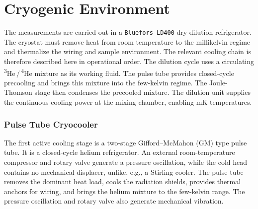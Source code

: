 \chapter{Cryogenic Environment}
\label{appendix:cryostat}

    The measurements are carried out in a \texttt{Bluefors LD400} dry dilution refrigerator. The cryostat must remove heat from room temperature to the millikelvin regime and thermalize the wiring and sample environment. The relevant cooling chain is therefore described here in operational order. The dilution cycle uses a circulating \textsuperscript{3}He\,/\,\textsuperscript{4}He mixture as its working fluid. The pulse tube provides closed-cycle precooling and brings this mixture into the few-kelvin regime. The Joule-Thomson stage then condenses the precooled mixture. The dilution unit supplies the continuous cooling power at the mixing chamber, enabling \unit{\milli\kelvin} temperatures.

    \subsection*{Pulse Tube Cryocooler}

        The first active cooling stage is a two-stage Gifford--McMahon (GM) type pulse tube. It is a closed-cycle helium refrigerator. An external room-temperature compressor and rotary valve generate a pressure oscillation, while the cold head contains no mechanical displacer, unlike, e.g., a Stirling cooler. The pulse tube removes the dominant heat load, cools the radiation shields, provides thermal anchors for wiring, and brings the helium mixture to the few-kelvin range. The pressure oscillation and rotary valve also generate mechanical vibration.

